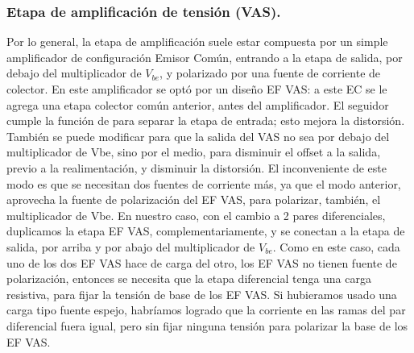 \documentclass[a4paper,12pt,twoside]{article}
\begin{document}
\subsubsection{Etapa de amplificación de tensión (VAS).}

Por lo general, la etapa de amplificación suele estar compuesta por un simple amplificador de configuración Emisor Común, entrando a la etapa de salida, por debajo del multiplicador de $V_{be}$, y polarizado por una fuente de corriente de colector. En este amplificador se optó por un diseño EF VAS: a este EC se le agrega una etapa colector común anterior, antes del amplificador. El seguidor cumple la función de para separar la etapa de entrada; esto mejora la distorsión. También se puede modificar para que la salida del VAS no sea por debajo del multiplicador de Vbe, sino por el medio, para disminuir el offset a la salida, previo a la realimentación, y disminuir la distorsión. El inconveniente de este modo es que se necesitan dos fuentes de corriente más, ya que el modo anterior, aprovecha la fuente de polarización del EF VAS, para polarizar, también, el multiplicador de Vbe. En nuestro caso, con el cambio a 2 pares diferenciales, duplicamos la etapa EF VAS, complementariamente, y se conectan a la etapa de salida, por arriba y por abajo del multiplicador de $V_{be}$. Como en este caso, cada uno de los dos EF VAS hace de carga del otro, los EF VAS no tienen fuente de polarización, entonces se necesita que la etapa diferencial tenga una carga resistiva, para fijar la tensión de base de los EF VAS. Si hubieramos usado una carga tipo fuente espejo, habríamos logrado que la corriente en las ramas del par diferencial fuera igual, pero sin fijar ninguna tensión para polarizar la base de los EF VAS.
\end{document}
